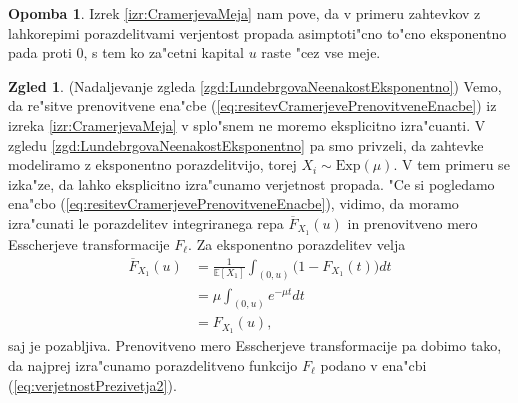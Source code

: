\documentclass[12pt, a4paper, reqno]{amsart}
\theoremstyle{definition}
\newtheorem{zgled}[definicija]{Zgled}
\newtheorem{opomba}[definicija]{Opomba}
\theoremstyle{plain}
\newcommand{\E}{\mathbb{E}}
\newcommand{\1}{\mathds{1}}
\begin{document}
            \begin{opomba}
                Izrek \ref{izr:CramerjevaMeja} nam pove, da v primeru zahtevkov z lahkorepimi porazdelitvami verjentost
                propada asimptoti"cno to"cno eksponentno pada proti $0$, s tem ko za"cetni kapital $u$ raste 
                "cez vse meje.
                
                \label{op:pomenCramerevegaIzreka}
            \end{opomba}

            \begin{zgled}(Nadaljevanje zgleda \ref{zgd:LundebrgovaNeenakostEksponentno})
                Vemo, da re"sitve prenovitvene ena"cbe (\ref{eq:resitevCramerjevePrenovitveneEnacbe}) 
                iz izreka \ref{izr:CramerjevaMeja} v splo"snem ne moremo eksplicitno izra"cuanti.
                V zgledu \ref{zgd:LundebrgovaNeenakostEksponentno} pa smo privzeli, da zahtevke modeliramo 
                z eksponentno porazdelitvijo, torej $X_i\sim\text{Exp}(\mu)$. 
                V tem primeru se izka"ze, da lahko eksplicitno izra"cunamo verjetnost propada.
                "Ce si pogledamo ena"cbo (\ref{eq:resitevCramerjevePrenovitveneEnacbe}), vidimo, da moramo 
                izra"cunati le porazdelitev integriranega repa $\overline{F}_{X_1}(u)$ in 
                prenovitveno mero Esscherjeve transformacije $F_\ell$. Za eksponentno porazdelitev
                velja
                \begin{align*}
                    \overline{F}_{X_1}(u)   &= \frac{1}{\E\left[X_1\right]}\int_{(0, u)}\bigl(1 - F_{X_1}(t)\bigr)dt \\
                                            &= \mu\int_{(0, u)}e^{-\mu t}dt \\
                                            &= F_{X_1}(u),
                \end{align*}
                saj je pozabljiva. Prenovitveno mero Esscherjeve transformacije pa dobimo tako, 
                da najprej izra"cunamo porazdelitveno funkcijo $F_\ell$ podano v ena"cbi (\ref{eq:verjetnostPrezivetja2}). 


\end{zgled}
\end{document}
